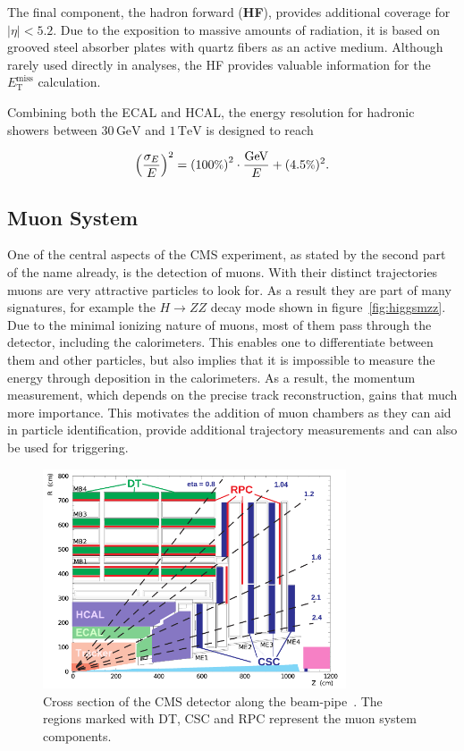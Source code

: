 The final component, the hadron forward (\textbf{HF}), provides additional coverage for $|\eta| < 5.2$. Due to the exposition to massive amounts of radiation, it is based on grooved steel absorber plates with quartz fibers as an active medium. Although rarely used directly in analyses, the HF provides valuable information for the $E^{\text{miss}}_{\text{T}}$ calculation.

Combining both the ECAL and HCAL, the energy resolution for hadronic showers between $30\,\text{GeV}$ and $1\,\text{TeV}$ is designed to reach~\cite{hcalreso}

\begin{equation}
  \label{eq:hcalreso}
  \left( \frac{\sigma_E}{E} \right)^2 = \left( 100\pct \right)^2 \cdot \frac{\text{GeV}}{E} + (4.5\pct)^2.
\end{equation}


\subsection{Muon System}
\label{sec:muon-system}

One of the central aspects of the CMS experiment, as stated by the second part of the name already, is the detection of muons. With their distinct trajectories muons are very attractive particles to look for. As a result they are part of many signatures, for example the $H \rightarrow ZZ$ decay mode shown in figure~\ref{fig:higgsmzz}. Due to the minimal ionizing nature of muons, most of them pass through the detector, including the calorimeters. This enables one to differentiate between them and other particles, but also implies that it is impossible to measure the energy through deposition in the calorimeters. As a result, the momentum measurement, which depends on the precise track reconstruction, gains that much more importance. This motivates the addition of muon chambers as they can aid in particle identification, provide additional trajectory measurements and can also be used for triggering.

\begin{figure}[!htb]
  \centering
  \includegraphics[width=0.8\textwidth]{plots/muonsys.pdf}
  \caption{Cross section of the CMS detector along the beam-pipe~\cite{muonid2}. The regions marked with DT, CSC and RPC represent the muon system components.}
  \label{fig:muonsys}
\end{figure}

